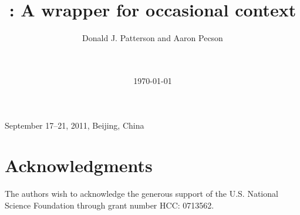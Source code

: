 \documentclass{chi2008}
\title{\Cacophony: A wrapper for occasional context}
\author{
\alignauthor
Donald J. Patterson and Aaron Pecson\\
       \affaddr{Department of Informatics}\\
       \affaddr{University of California, Irvine, USA}\\
       \email{ \{djp3,apecson\}@uci.edu}
}
\begin{document}
 {September 17--21, 2011, Beijing, China} 





\date{\today}

\maketitle







\section{Acknowledgments}
The authors wish to acknowledge the generous support of the U.S. National
Science Foundation through grant number HCC: 0713562.



\balancecolumns
\end{document}
